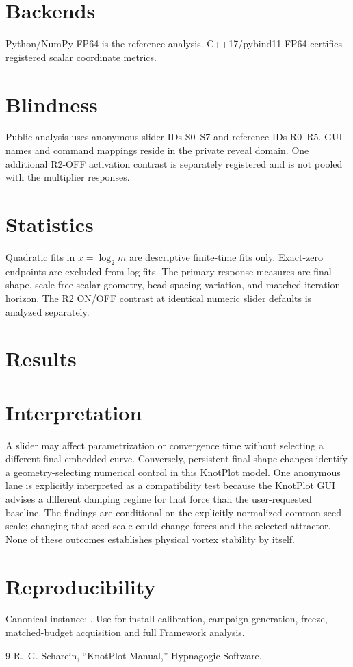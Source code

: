 \documentclass[11pt,a4paper]{article}
\begin{document}
\section{Backends}
Python/NumPy FP64 is the reference analysis. C++17/pybind11 FP64 certifies registered scalar coordinate metrics.
\section{Blindness}
Public analysis uses anonymous slider IDs S0--S7 and reference IDs R0--R5. GUI names and command mappings reside in the private reveal domain. One additional R2-OFF activation contrast is separately registered and is not pooled with the multiplier responses.
\section{Statistics}
Quadratic fits in $x=\log_2m$ are descriptive finite-time fits only. Exact-zero endpoints are excluded from log fits. The primary response measures are final shape, scale-free scalar geometry, bead-spacing variation, and matched-iteration horizon. The R2 ON/OFF contrast at identical numeric slider defaults is analyzed separately.
\section{Results}
\section{Interpretation}
A slider may affect parametrization or convergence time without selecting a different final embedded curve. Conversely, persistent final-shape changes identify a geometry-selecting numerical control in this KnotPlot model. One anonymous lane is explicitly interpreted as a compatibility test because the KnotPlot GUI advises a different damping regime for that force than the user-requested baseline. The findings are conditional on the explicitly normalized common seed scale; changing that seed scale could change forces and the selected attractor. None of these outcomes establishes physical vortex stability by itself.
\section{Reproducibility}
Canonical instance: . Use  for install calibration, campaign generation, freeze, matched-budget acquisition and full Framework analysis.
\begin{thebibliography}{9}
 R.~G. Scharein, ``KnotPlot Manual,'' Hypnagogic Software.
\end{thebibliography}
\end{document}
